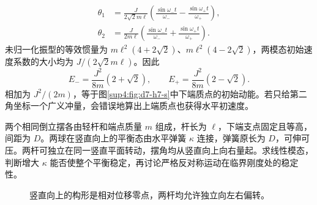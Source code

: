 \begin{solution}
\[
\boxed{\begin{aligned}
\theta_1&=\frac{J}{2\sqrt2m\ell}\left(\frac{\sin\omega_-t}{\omega_-}-\frac{\sin\omega_+t}{\omega_+}\right),\\
\theta_2&=\frac{J}{2m\ell}\left(\frac{\sin\omega_-t}{\omega_-}+\frac{\sin\omega_+t}{\omega_+}\right).
\end{aligned}}
\]
未归一化振型的等效惯量为 $m\ell^2(4+2\sqrt2)$、$m\ell^2(4-2\sqrt2)$，两模态初始速度系数的大小均为 $J/(2\sqrt2m\ell)$。因此
\[
E_- =\frac{J^2}{8m}(2+\sqrt2),\qquad
E_+ =\frac{J^2}{8m}(2-\sqrt2).
\]
相加为 $J^2/(2m)$，等于图\ref{sup4:fig:d7-h7-s}中下端质点的初始动能。若只给第二角坐标一个广义冲量，会错误地算出上端质点也获得水平初速度。
\end{solution}


\begin{exercise}[弹簧能否稳定两个倒立摆（选做）]\label{sup4:problem-exercise-12}\label{sup4:ex:d7-h12}
两个相同倒立摆各由轻杆和端点质量 $m$ 组成，杆长为 $\ell$，下端支点固定且等高，间距为 $D$。两球在竖直向上的平衡态由水平弹簧 $\kappa$ 连接，弹簧原长为 $D$，可伸可压。两杆可独立在同一竖直平面转动，摆角均从竖直向上向右量起。求线性模态，判断增大 $\kappa$ 能否使整个平衡稳定，再讨论严格反对称运动在临界刚度处的稳定性。
\end{exercise}
\begin{figure}[H]\centering
{}
\caption{竖直向上的构形是相对位移零点，两杆均允许独立向左右偏转。}\label{sup4:fig:d7-h12-q}
\end{figure}
